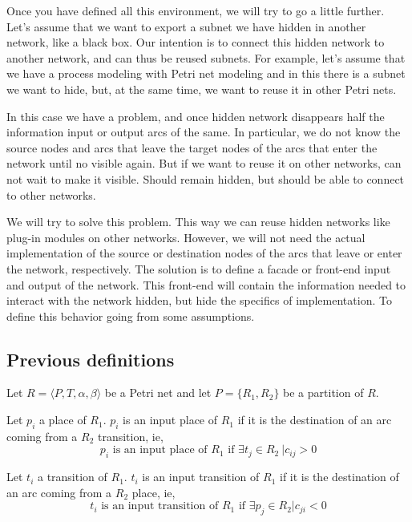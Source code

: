 {Once you have defined all this environment, we will try to go a little further. Let's assume that we want to export a subnet we have hidden in another network, like a black box. Our intention is to connect this hidden network to another network, and can thus be reused subnets. For example, let's assume that we have a process modeling with Petri net modeling and in this there is a subnet we want to hide, but, at the same time, we want to reuse it in other Petri nets.

In this case we have a problem, and once hidden network disappears half the information input or output arcs of the same. In particular, we do not know the source nodes and arcs that leave the target nodes of the arcs that enter the network until no visible again. But if we want to reuse it on other networks, can not wait to make it visible. Should remain hidden, but should be able to connect to other networks.

We will try to solve this problem. This way we can reuse hidden networks like plug-in modules on other networks. However, we will not need the actual implementation of the source or destination nodes of the arcs that leave or enter the network, respectively. The solution is to define a facade or front-end input and output of the network. This front-end will contain the information needed to interact with the network hidden, but hide the specifics of implementation. To define this behavior going from some assumptions.

\subsection{Previous definitions}

Let $R=\langle P,T,\alpha,\beta\rangle$ be a Petri net and let $P=\{R_1,
R_2\}$ be a partition of $R$. 

\begin{definition}
Let $p_i$ a place of $R_1$. $p_i$ is an input place of $R_1$ if it is the
destination of an arc coming from a $R_2$ transition, ie,
\[
p_i \mbox{ is an input place of } R_1 \mbox{ if } \exists t_j \in R_2\ | c_{ij}>0
\]
\end{definition}

\begin{definition}
Let $t_i$ a transition of $R_1$. $t_i$ is an input transition of $R_1$ if it is the destination of an arc coming from a $R_2$ place, ie,
\[
t_i \mbox{ is an input transition of } R_1 \mbox{ if } \exists p_j \in R_2 | c_{ji}<
0
\]
\end{definition}

}

